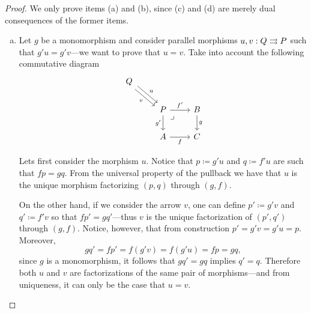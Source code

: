 \begin{proof}
We only prove items (a) and (b), since (c) and (d) are merely dual consequences
of the former items.
\begin{enumerate}[(a)]\setlength\itemsep{0em}
\item Let \(g\) be a monomorphism and consider parallel morphisms \(u, v: Q
  \rightrightarrows P\) such that \(g' u = g' v\)---we want to prove that \(u = v\). Take
  into account the following commutative diagram
  \[
  \begin{tikzcd}
  Q \ar[rd, shift left, "u"] \ar[rd, shift right, "v"'] & & \\
  &P \ar[r, "f'"] \ar[d, "g'"']
  \ar[rd, phantom, very near start, "\lrcorner"]
  &B \ar[d, "g"] \\
  &A \ar[r, "f"'] &C
  \end{tikzcd}
  \]

  Lets first consider the morphism \(u\). Notice that \(p \coloneq g' u\) and
  \(q \coloneq f' u\) are such that \(f p = g q\). From the universal property
  of the pullback we have that \(u\) is the unique morphism factorizing
  \((p, q)\) through \((g, f)\).

  On the other hand, if we consider the arrow \(v\), one can define
  \(p' \coloneq g' v\) and \(q' \coloneq f' v\) so that \(f p' = g q'\)---thus
  \(v\) is the unique factorization of \((p', q')\) through \((g, f)\). Notice,
  however, that from construction \(p' = g' v = g' u = p\). Moreover,
  \[
  g q' = f p' = f (g' v) = f (g' u) = f p = g q,
  \]
  since \(g\) is a monomorphism, it follows that \(g q' = g q\) implies
  \(q' = q\). Therefore both \(u\) and \(v\) are factorizations of the same pair
  of morphisms---and from uniqueness, it can only be the case that \(u = v\).


\end{enumerate}
\end{proof}
